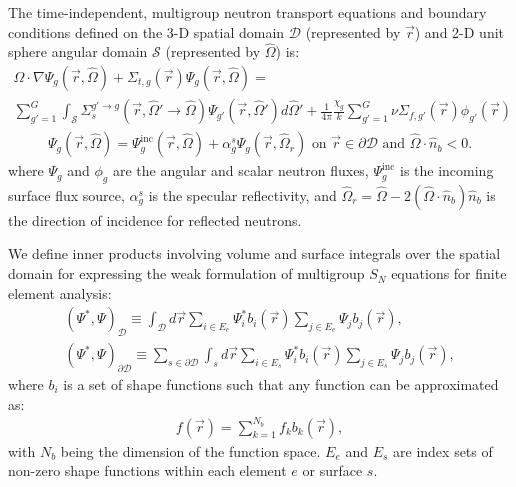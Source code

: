 \documentclass[letterpaper]{mc2025}
\begin{document}
The time-independent, multigroup neutron transport equations and boundary conditions defined on the
3-D spatial domain $\mathcal{D}$ (represented by $\vec{r}$) and 2-D unit sphere angular domain
$\mathcal{S}$ (represented by $\hat{\Omega}$) is:
%
\begin{multline}
  \hat{\Omega}\cdot\nabla\Psi_g(\vec{r},\hat{\Omega}) + \Sigma_{t,g}(\vec{r})
  \Psi_g(\vec{r},\hat{\Omega}) = \\
  \sum^G_{g'=1}\int_\mathcal{S} \Sigma_s^{g'\rightarrow g}(\vec{r},\hat{\Omega}'\rightarrow\hat{\Omega})
  \Psi_{g'}(\vec{r},\hat{\Omega}')d\hat{\Omega}'
  + \frac{1}{4\pi}\frac{\chi_{g}}{k}\sum^G_{g'=1} \nu\Sigma_{f,g'}(\vec{r}) \phi_{g'}(\vec{r})
  \label{eq:mg-nte}
\end{multline}
%
\begin{gather}
  \Psi_g(\vec{r},\hat{\Omega}) = \Psi^\text{inc}_g(\vec{r},\hat{\Omega}) +
  \alpha^s_g\Psi_g(\vec{r},\hat{\Omega}_r)
  \mbox{ on } \vec{r} \in \partial\mathcal{D} \mbox{ and } \hat{\Omega}\cdot\hat{n}_b < 0.
  \label{eq:mg-nte-bc}
\end{gather}
%
where $\Psi_g$ and $\phi_g$ are the angular and scalar neutron fluxes,
$\Psi^\text{inc}_g$ is the incoming surface flux source, $\alpha^s_g$ is
the specular reflectivity, and $\hat{\Omega}_r=\hat{\Omega}-2(\hat{\Omega}\cdot\hat{n}_b)\hat{n}_b$
is the direction of incidence for reflected neutrons.

We define inner products involving volume and surface integrals over the spatial domain for
expressing the weak formulation of multigroup $S_N$ equations for finite element analysis:
%
\begin{gather}
  \left(\Psi^*, \Psi\right)_\mathcal{D} \equiv \int_\mathcal{D}d\vec{r}
  \sum_{i\in E_e}\Psi^*_i b_i(\vec{r})\sum_{j\in E_e}\Psi_jb_j(\vec{r}), \\
  \left(\Psi^*, \Psi\right)_{\partial\mathcal{D}} \equiv
  \sum_{s\in\partial\mathcal{D}}\int_s d\vec{r}\sum_{i\in E_s}\Psi^*_i b_i(\vec{r})\sum_{j\in E_s}
  \Psi_j b_j(\vec{r}),
\end{gather}
%
where $b_i$ is a set of shape functions such that any function can be approximated as:
%
\begin{gather}
  f(\vec{r}) = \sum^{N_b}_{k=1}f_k b_k(\vec{r}),
\end{gather}
%
with $N_b$ being the dimension of the function space. $E_e$ and $E_s$ are index sets of non-zero
shape functions within each element $e$ or surface $s$.
\end{document}
